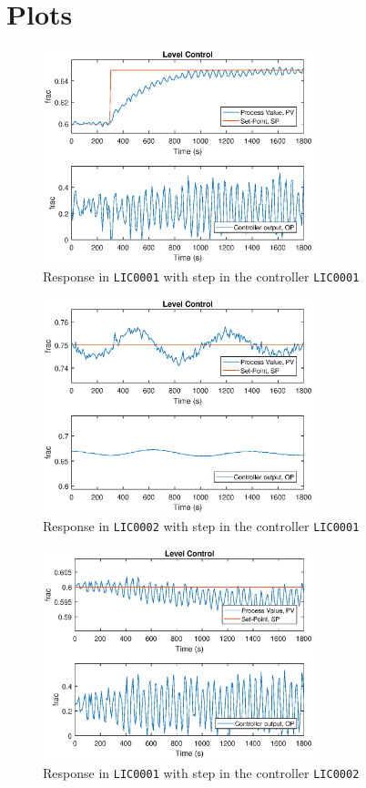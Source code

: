 \documentclass[a4paper]{scrartcl}
\begin{document}
\section{Plots}\label{sec:plots}
\begin{figure}[ht!]
	\centering
	\includegraphics[width=0.7\textwidth]{fig/untuned/LIC0001_step1_untuned.eps}
	\caption{Response in \texttt{LIC0001} with step in the controller \texttt{LIC0001}}
	\label{fig:5a1}
\end{figure}
\begin{figure}[ht!]
	\centering
	\includegraphics[width=0.7\textwidth]{fig/untuned/LIC0002_step1_untuned.eps}
	\caption{Response in \texttt{LIC0002} with step in the controller \texttt{LIC0001}}
	\label{fig:5a2}
\end{figure}
\begin{figure}[ht!]
	\centering
	\includegraphics[width=0.7\textwidth]{fig/untuned/LIC0001_step2_untuned.eps}
	\caption{Response in \texttt{LIC0001} with step in the controller \texttt{LIC0002}}
	\label{fig:5a3}
\end{figure}
\end{document}

